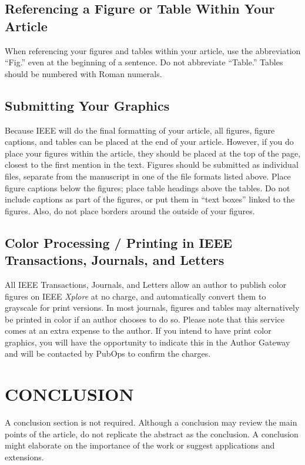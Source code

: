 \documentclass[correspondence]{IEEEtaes}
\begin{document}
\subsection{Referencing a Figure or Table Within Your Article}

When referencing your figures and tables within your article, use the abbreviation ``Fig.'' even at the beginning of a sentence. Do not abbreviate ``Table.'' Tables should be numbered with Roman numerals.

\subsection{Submitting Your Graphics}

Because IEEE will do the final formatting of your article, all figures, figure captions, and tables can be placed at the end of your article. However, if you do place your figures within the article, they should be placed at the top of the page, closest to the first mention in the text. Figures should be submitted as individual files, separate from the manuscript in one of the file formats listed above. Place figure captions below the figures; place table headings above the tables. Do not include captions as part of the figures, or put them in ``text boxes'' linked to the figures. Also, do not place borders around the outside of your figures.

\subsection{Color Processing / Printing in IEEE Transactions, Journals, and Letters}

All IEEE Transactions, Journals, and Letters allow an author to publish color figures on IEEE \emph{Xplore} at no charge, and automatically convert them to grayscale for print versions. In most journals, figures and tables may alternatively be printed in color if an author chooses to do so. Please note that this service comes at an extra expense to the author. If you intend to have print color graphics, you will have the opportunity to indicate this in the Author Gateway and will be contacted by PubOps to confirm the charges.

\section{CONCLUSION}

A conclusion section is not required. Although a conclusion may review the main points of the article, do not replicate the abstract as the conclusion. A conclusion might elaborate on the importance of the work or suggest applications and extensions.
\end{document}

